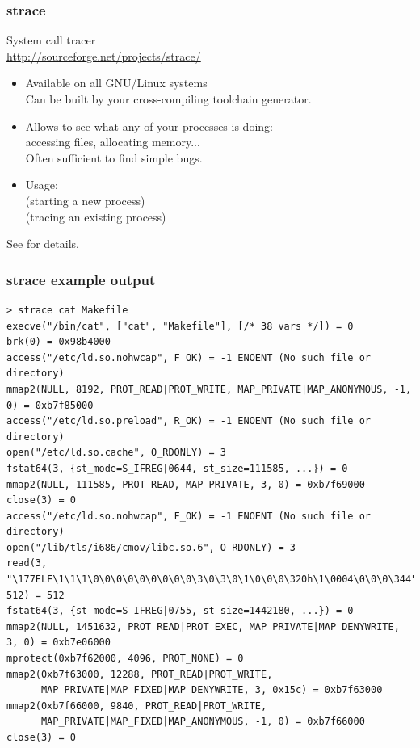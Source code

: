 \begin{frame}
  \frametitle{strace}
  System call tracer\\
  \url{http://sourceforge.net/projects/strace/}
  \begin{itemize}
  \item Available on all GNU/Linux systems\\
    Can be built by your cross-compiling toolchain generator.
  \item Allows to see what any of your processes is doing:\\
    accessing files, allocating memory...\\
    Often sufficient to find simple bugs.
  \item Usage:\\
     (starting a new process)\\
     (tracing an existing process)
  \end{itemize}
  See  for details.
\end{frame}

\begin{frame}[fragile]
  \frametitle{strace example output}
  \tiny
  \begin{block}{}
\begin{verbatim}
> strace cat Makefile
execve("/bin/cat", ["cat", "Makefile"], [/* 38 vars */]) = 0
brk(0) = 0x98b4000
access("/etc/ld.so.nohwcap", F_OK) = -1 ENOENT (No such file or directory)
mmap2(NULL, 8192, PROT_READ|PROT_WRITE, MAP_PRIVATE|MAP_ANONYMOUS, -1, 0) = 0xb7f85000
access("/etc/ld.so.preload", R_OK) = -1 ENOENT (No such file or directory)
open("/etc/ld.so.cache", O_RDONLY) = 3
fstat64(3, {st_mode=S_IFREG|0644, st_size=111585, ...}) = 0
mmap2(NULL, 111585, PROT_READ, MAP_PRIVATE, 3, 0) = 0xb7f69000
close(3) = 0
access("/etc/ld.so.nohwcap", F_OK) = -1 ENOENT (No such file or directory)
open("/lib/tls/i686/cmov/libc.so.6", O_RDONLY) = 3
read(3, "\177ELF\1\1\1\0\0\0\0\0\0\0\0\0\3\0\3\0\1\0\0\0\320h\1\0004\0\0\0\344"..., 512) = 512
fstat64(3, {st_mode=S_IFREG|0755, st_size=1442180, ...}) = 0
mmap2(NULL, 1451632, PROT_READ|PROT_EXEC, MAP_PRIVATE|MAP_DENYWRITE, 3, 0) = 0xb7e06000
mprotect(0xb7f62000, 4096, PROT_NONE) = 0
mmap2(0xb7f63000, 12288, PROT_READ|PROT_WRITE,
      MAP_PRIVATE|MAP_FIXED|MAP_DENYWRITE, 3, 0x15c) = 0xb7f63000
mmap2(0xb7f66000, 9840, PROT_READ|PROT_WRITE,
      MAP_PRIVATE|MAP_FIXED|MAP_ANONYMOUS, -1, 0) = 0xb7f66000
close(3) = 0
\end{verbatim}
  \end{block}
\end{frame}

